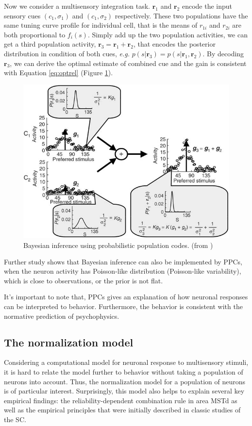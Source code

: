 \documentclass{article}[11pt]
\newcommand{\eg}{\textit{e.g. }}
\begin{document}
Now we consider a multisensory integration task. $\mathbf{r}_1$ and $\mathbf{r}_2$ encode the input sensory cues $(c_1, \sigma_1)$ and $(c_1, \sigma_2)$ respectively. These two populations have the same tuning curve profile for individual cell, that is the means of $r_{1i}$ and $r_{2i}$ are both proportional to $f_i(s)$. Simply add up the two population activities, we can get a third population activity, $\mathbf{r}_3 = \mathbf{r}_1 + \mathbf{r}_2$, that encodes the posterior distribution in condition of both cues, \eg $p(s|\mathbf{r}_3) = p(s|\mathbf{r}_1,\mathbf{r}_2)$. By decoding $\mathbf{r}_3$, we can derive the optimal estimate of combined cue and the gain is consistent with Equation \ref{eq:optrel} (Figure \ref{fig:infer}).

\begin{figure}[tpb]
  \centering
  \includegraphics[width=.8\textwidth]{infer}
  \caption{Bayesian inference using probabilistic population codes. (from \cite{ma_bayesian_2006})}
  \label{fig:infer}
\end{figure}

Further study shows that Bayesian inference can also be implemented by PPCs, when the neuron activity has Poisson-like distribution (Poisson-like variability), which is close to observations, or the prior is not flat.

It's important to note that, PPCs gives an explanation of how neuronal responses can be interpreted to behavior. Furthermore, the behavior is consistent with the normative prediction of psychophysics.

\subsection{The normalization model}
Considering a computational model for neuronal response to multisensory stimuli, it is hard to relate the model further to behavior without taking a population of neurons into account. Thus, the normalization model \cite{ohshiro_normalization_2011} for a population of neurons is of particular interest. Surprisingly, this model also helps to explain several key empirical findings: the reliability-dependent combination rule in area MSTd as well as the empirical principles that were initially described in classic studies of the SC.
\end{document}
